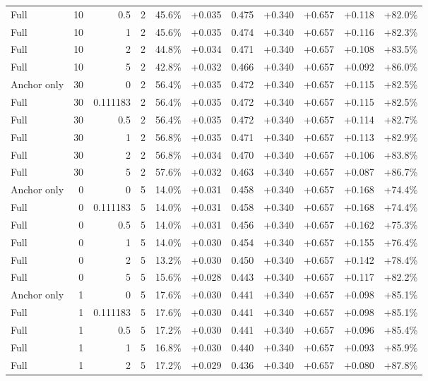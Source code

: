 \begin{table}[htbp]
\begin{tabular}{lrrrccccccc}
Full & 10 & 0.5 & 2 & 45.6\% & +0.035 & 0.475 & +0.340 & +0.657 & +0.118 & +82.0\% \\
Full & 10 & 1 & 2 & 45.6\% & +0.035 & 0.474 & +0.340 & +0.657 & +0.116 & +82.3\% \\
Full & 10 & 2 & 2 & 44.8\% & +0.034 & 0.471 & +0.340 & +0.657 & +0.108 & +83.5\% \\
Full & 10 & 5 & 2 & 42.8\% & +0.032 & 0.466 & +0.340 & +0.657 & +0.092 & +86.0\% \\
Anchor only & 30 & 0 & 2 & 56.4\% & +0.035 & 0.472 & +0.340 & +0.657 & +0.115 & +82.5\% \\
Full & 30 & 0.111183 & 2 & 56.4\% & +0.035 & 0.472 & +0.340 & +0.657 & +0.115 & +82.5\% \\
Full & 30 & 0.5 & 2 & 56.4\% & +0.035 & 0.472 & +0.340 & +0.657 & +0.114 & +82.7\% \\
Full & 30 & 1 & 2 & 56.8\% & +0.035 & 0.471 & +0.340 & +0.657 & +0.113 & +82.9\% \\
Full & 30 & 2 & 2 & 56.8\% & +0.034 & 0.470 & +0.340 & +0.657 & +0.106 & +83.8\% \\
Full & 30 & 5 & 2 & 57.6\% & +0.032 & 0.463 & +0.340 & +0.657 & +0.087 & +86.7\% \\
Anchor only & 0 & 0 & 5 & 14.0\% & +0.031 & 0.458 & +0.340 & +0.657 & +0.168 & +74.4\% \\
Full & 0 & 0.111183 & 5 & 14.0\% & +0.031 & 0.458 & +0.340 & +0.657 & +0.168 & +74.4\% \\
Full & 0 & 0.5 & 5 & 14.0\% & +0.031 & 0.456 & +0.340 & +0.657 & +0.162 & +75.3\% \\
Full & 0 & 1 & 5 & 14.0\% & +0.030 & 0.454 & +0.340 & +0.657 & +0.155 & +76.4\% \\
Full & 0 & 2 & 5 & 13.2\% & +0.030 & 0.450 & +0.340 & +0.657 & +0.142 & +78.4\% \\
Full & 0 & 5 & 5 & 15.6\% & +0.028 & 0.443 & +0.340 & +0.657 & +0.117 & +82.2\% \\
Anchor only & 1 & 0 & 5 & 17.6\% & +0.030 & 0.441 & +0.340 & +0.657 & +0.098 & +85.1\% \\
Full & 1 & 0.111183 & 5 & 17.6\% & +0.030 & 0.441 & +0.340 & +0.657 & +0.098 & +85.1\% \\
Full & 1 & 0.5 & 5 & 17.2\% & +0.030 & 0.441 & +0.340 & +0.657 & +0.096 & +85.4\% \\
Full & 1 & 1 & 5 & 16.8\% & +0.030 & 0.440 & +0.340 & +0.657 & +0.093 & +85.9\% \\
Full & 1 & 2 & 5 & 17.2\% & +0.029 & 0.436 & +0.340 & +0.657 & +0.080 & +87.8\% \\

\end{tabular}
\end{table}
